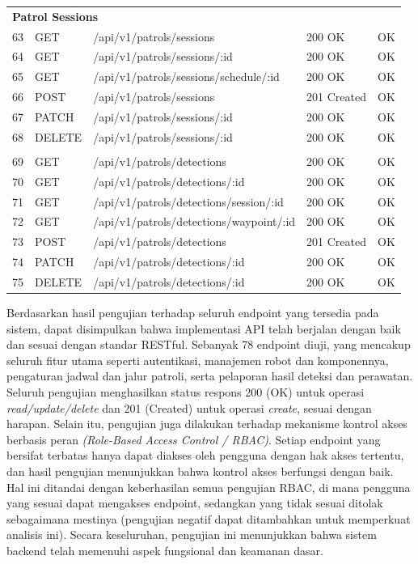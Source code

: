 \begin{longtable}{p{0.7cm} p{1.4cm} p{7cm} p{2.2cm} p{1.2cm}}
\multicolumn{5}{l}{\textbf{Patrol Sessions}}\\
63 & GET & /api/v1/patrols/sessions & 200 OK & OK \\
64 & GET & /api/v1/patrols/sessions/:id & 200 OK & OK \\
65 & GET & /api/v1/patrols/sessions/schedule/:id & 200 OK & OK \\
66 & POST & /api/v1/patrols/sessions & 201 Created & OK \\
67 & PATCH & /api/v1/patrols/sessions/:id & 200 OK & OK \\
68 & DELETE & /api/v1/patrols/sessions/:id & 200 OK & OK \\
\addlinespace

\multicolumn{5}{l}{\textbf{Patrol Detections (Overheat)}}\\
69 & GET & /api/v1/patrols/detections & 200 OK & OK \\
70 & GET & /api/v1/patrols/detections/:id & 200 OK & OK \\
71 & GET & /api/v1/patrols/detections/session/:id & 200 OK & OK \\
72 & GET & /api/v1/patrols/detections/waypoint/:id & 200 OK & OK \\
73 & POST & /api/v1/patrols/detections & 201 Created & OK \\
74 & PATCH & /api/v1/patrols/detections/:id & 200 OK & OK \\
75 & DELETE & /api/v1/patrols/detections/:id & 200 OK & OK \\
\end{longtable}
\endgroup


Berdasarkan hasil pengujian terhadap seluruh endpoint yang tersedia pada sistem, dapat disimpulkan bahwa implementasi API telah berjalan dengan baik dan sesuai dengan standar RESTful. Sebanyak 78 endpoint diuji, yang mencakup seluruh fitur utama seperti autentikasi, manajemen robot dan komponennya, pengaturan jadwal dan jalur patroli, serta pelaporan hasil deteksi dan perawatan. Seluruh pengujian menghasilkan status respons 200 (OK) untuk operasi \textit{read/update/delete} dan 201 (Created) untuk operasi \textit{create}, sesuai dengan harapan. Selain itu, pengujian juga dilakukan terhadap mekanisme kontrol akses berbasis peran \emph{(Role-Based Access Control / RBAC)}. Setiap endpoint yang bersifat terbatas hanya dapat diakses oleh pengguna dengan hak akses tertentu, dan hasil pengujian menunjukkan bahwa kontrol akses berfungsi dengan baik. Hal ini ditandai dengan keberhasilan semua pengujian RBAC, di mana pengguna yang sesuai dapat mengakses endpoint, sedangkan yang tidak sesuai ditolak sebagaimana mestinya (pengujian negatif dapat ditambahkan untuk memperkuat analisis ini). Secara keseluruhan, pengujian ini menunjukkan bahwa sistem backend telah memenuhi aspek fungsional dan keamanan dasar. 


